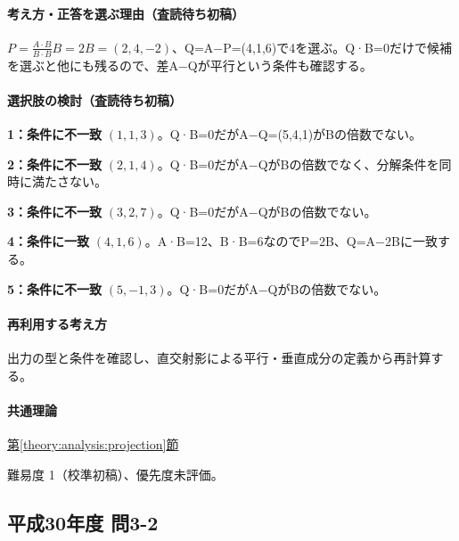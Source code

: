 \paragraph{考え方・正答を選ぶ理由（査読待ち初稿）} \(P=\frac{A\cdot B}{B\cdot B}B=2B=(2,4,-2)\)、Q=\allowbreak{}A−P=\allowbreak{}(4,1,6)で4を選ぶ。Q·B=\allowbreak{}0だけで候補を選ぶと他にも残るので、差A−Qが平行という条件も確認する。

\paragraph{選択肢の検討（査読待ち初稿）}\mbox{}\par

\noindent\textbf{1：条件に不一致} \((1,1,3)\)。Q·B=\allowbreak{}0だがA−Q=\allowbreak{}(5,4,1)がBの倍数でない。\par

\noindent\textbf{2：条件に不一致} \((2,1,4)\)。Q·B=\allowbreak{}0だがA−QがBの倍数でなく、分解条件を同時に満たさない。\par

\noindent\textbf{3：条件に不一致} \((3,2,7)\)。Q·B=\allowbreak{}0だがA−QがBの倍数でない。\par

\noindent\textbf{4：条件に一致} \((4,1,6)\)。A·B=\allowbreak{}12、B·B=\allowbreak{}6なのでP=\allowbreak{}2B、Q=\allowbreak{}A−2Bに一致する。\par

\noindent\textbf{5：条件に不一致} \((5,-1,3)\)。Q·B=\allowbreak{}0だがA−QがBの倍数でない。\par

\paragraph{再利用する考え方} 出力の型と条件を確認し、直交射影による平行・垂直成分の定義から再計算する。

\paragraph{共通理論} \hyperref[theory:analysis:projection]{第\ref*{theory:analysis:projection}節}

\par 難易度 1（校準初稿）、優先度未評価。

\subsection{平成30年度 問3-2}
\label{q:h30-reg-basic-3-2}

